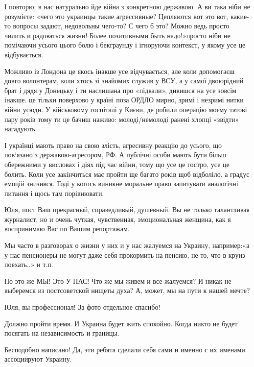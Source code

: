 \begin{itemize}
\begin{itemize}
І повторю: в нас натурально йде війна з конкретною державою. А ви така ніби не
розумієте: «чего это украинцы такие агрессивные? Цепляются вот это вот,
какие-то вопросы задают, недовольны чего-то? С чего б это? Можно ведь просто
чилить и радоваться жизни!  Более позитивными быть надо!»просто ніби не
помічаючи усього цього болю і бекграунду і ігноруючи контекст, у якому усе це
відбувається. 

Можливо із Лондона це якось інакше усе відчувається, але коли допомогаєш довго
волонтерам, коли хтось зі знайомих служив у ВСУ, а у самої двоюрідний брат і
дядя у Донецьку і ти наслишана про «підвали», дивишся на усе зовсім інакше. це
тільки поверхово у країні поза ОРДЛО мирно, зримі і незримі нитки війни усюди.
У військовому госпіталі у Києви, де робили операцію моєму татові пару років
тому ти це бачиш наживо: молоді/немолоді ранені хлопці «звідти» нагадують. 

І українці мають право на свою злість, агресивну реакцію до усього, що
пов‘язано з державою-агресором, РФ. А публічні особи мають бути більш
обережними у висловах і діях під час війни, тому що усе це гостро, усе це
болить. Коли усе закінчиться має пройти ще багато років щоб відболіло, а градус
емоцій знизився.  Тоді у когось виникне моральне право запитувати аналогічні
питання і щось там порівнювати.

\end{itemize} %


Юля, пост Ваш прекрасный, справедливый, душевный. Вы не только талантливая
журналист, но и очень чуткая, чувственная, эмоциональная женщина, как я
воспринимаю Вас по Вашим репортажам.

Мы часто в разговорах о жизни у них и у нас жалуемся на Украину, например:«а у
нас пенсионеры не могут даже себя прокормить на пенсию, не то, что в круиз
поехать..» и т.п.

Но это же МЫ! Это У НАС! Что же мы живем и все жалуемся? И никак не выберемся
из постсоветской нищеты духа? А, может, мы на пути к нашей мечте?

Юля, вы профессионал! За фото отдельное спасибо!

Должно пройти время. И Украина будет жить спокойно. Когда никто не будет посягать на независимость и границы.

Бесподобно написано! Да, эти ребята сделали себя сами и именно с их именами ассоциируют Украину.


\end{itemize}
